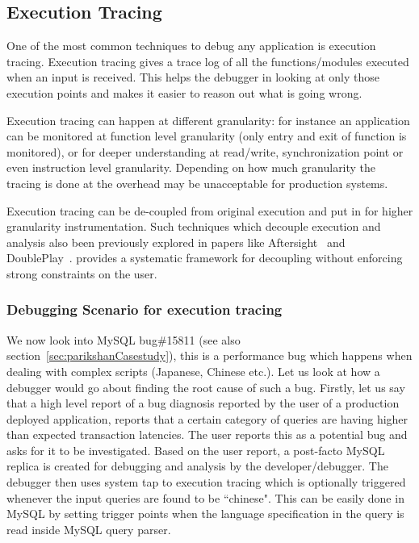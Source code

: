 \subsection{Execution Tracing}
\label{sec:activeExecutionTracing}

One of the most common techniques to debug any application is execution tracing. 
Execution tracing gives a trace log of all the functions/modules executed when an input is received. 
This helps the debugger in looking at only those execution points and makes it easier to reason out what is going wrong.

Execution tracing can happen at different granularity: for instance an application can be monitored at function level granularity (only entry and exit of function is monitored), or for deeper understanding at read/write, synchronization point or even instruction level granularity.
Depending on how much granularity the tracing is done at the overhead may be unacceptable for production systems.

Execution tracing can be de-coupled from original execution and put in \debugcontainer for higher granularity instrumentation. 
Such techniques which decouple execution and analysis also been previously explored in papers like Aftersight~\cite{aftersight} and DoublePlay~\cite{doubleplay}.
\parikshan provides a systematic framework for decoupling without enforcing strong constraints on the user.

\subsubsection{Debugging Scenario for execution tracing}

We now look into MySQL bug\#15811 (see also section~\ref{sec:parikshanCasestudy}), this is a performance bug which happens when dealing with complex scripts (Japanese, Chinese etc.). Let us look at how a debugger would go about finding the root cause of such a bug.
Firstly, let us say that a high level report of a bug diagnosis reported by the user of a production deployed application, reports that a certain category of queries are having higher than expected transaction latencies.
The user reports this as a potential bug and asks for it to be investigated.
Based on the user report, a post-facto MySQL replica is created for debugging and analysis by the developer/debugger.
The debugger then uses system tap to execution tracing which is optionally triggered whenever the input queries are found to be ``chinese". 
This can be easily done in MySQL by setting trigger points when the language specification in the query is read inside MySQL query parser.

